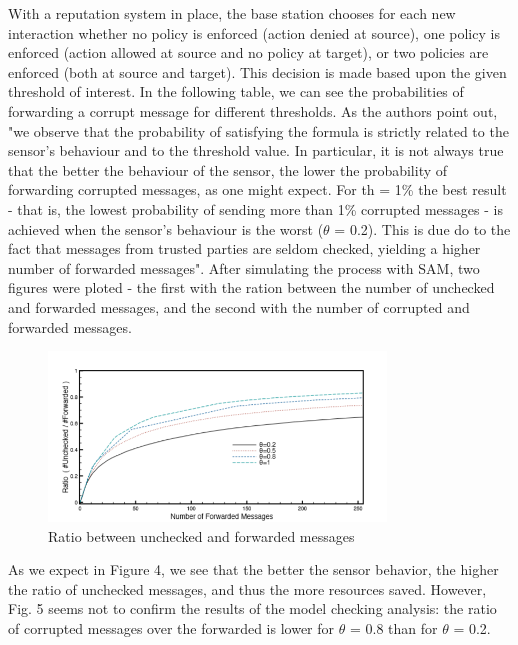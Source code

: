 \documentclass[12pt,a4paper,twoside]{report}
\begin{document}
With a reputation system in place, the base station chooses for each new interaction whether no policy is enforced (action denied at source), one policy is enforced (action allowed at source and no policy at target), or two policies are enforced (both at source and target). This decision is made based upon the given threshold of interest. In the following table, we can see the probabilities of forwarding a corrupt message for different thresholds. As the authors point out, "we observe that the probability of satisfying the formula is strictly related to the sensor's behaviour and to the threshold value. In particular, it is not always true that the better the behaviour of the sensor, the lower the probability of forwarding corrupted messages, as one might expect. For th = 1\% the best result - that is, the lowest probability of sending more than 1\% corrupted messages - is achieved when the sensor's behaviour is the worst ($\theta$ = 0.2). This is due do to the fact that messages from trusted parties are seldom checked, yielding a higher number of forwarded messages". After simulating the process with SAM, two figures were ploted - the first with the ration between the number of unchecked and forwarded messages, and the second with the number of corrupted and forwarded messages.\par

\begin{figure}[ht]
	\begin{center}
  \includegraphics[width=0.8\textwidth,natwidth=631,natheight=345]{./figures/figure-04.png}
  \end{center}
  \caption{Ratio between unchecked and forwarded messages \cite{vigo;etal:2014}}
  \label{fig:label}
\end{figure}

As we expect in Figure 4, we see that the better the sensor behavior, the higher the ratio of unchecked messages, and thus the more resources saved. However, Fig. 5 seems not to confirm the results of the model checking analysis: the ratio of corrupted messages over the forwarded is lower for $\theta$ = 0.8 than for $\theta$ = 0.2. 
\end{document}
